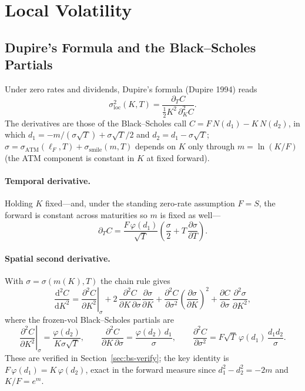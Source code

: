\documentclass[11pt]{book}
\theoremstyle{plain}
\theoremstyle{definition}
\theoremstyle{remark}
\newcommand{\mln}{m}                             %
\newcommand{\lF}{\ell_F}                         %
\newcommand{\ssm}{\sigma_{\mathrm{smile}}}       %
\newcommand{\satm}{\sigma_{\mathrm{ATM}}}        %
\newcommand{\sloc}{\sigma_{\mathrm{loc}}}        %
\newcommand{\npdf}{\varphi}                      %
\newcommand{\ncdf}{N}                            %
\newcommand{\SigmaM}{\Sigma_M}                   %
\newcommand{\dd}{\mathrm{d}}                                  %
\newcommand{\pd}[2]{\frac{\partial #1}{\partial #2}}          %
\newcommand{\pdd}[2]{\frac{\partial^2 #1}{\partial #2^2}}     %
\newcommand{\pdc}[3]{\frac{\partial^2 #1}{\partial #2\,\partial #3}} %
\newcommand{\atfixed}[2]{\left.#1\right|_{#2}}                %
\begin{document}
\section{Local Volatility}
\label{sec:localvol}

\subsection{Dupire's Formula and the Black--Scholes Partials}
\label{sec:dupire}

Under zero rates and dividends, Dupire's formula (Dupire 1994) reads
\begin{equation}\label{eq:dupire}
\sloc^2(K,T) = \frac{\partial_T C}{\tfrac12 K^2\,\partial_K^2 C}.
\end{equation}
The derivatives are those of the Black--Scholes call
$C = F\,\ncdf(d_1) - K\,\ncdf(d_2)$, in which
$d_1 = -\mln/(\sigma\sqrt{T}) + \sigma\sqrt{T}/2$ and $d_2 = d_1 - \sigma\sqrt{T}$;
$\sigma = \satm(\lF,T) + \ssm(\mln,T)$ depends on $K$ only through
$\mln = \ln(K/F)$ (the ATM component is constant in $K$ at fixed forward).

\paragraph{Temporal derivative.} Holding $K$ fixed---and, under the standing
zero-rate assumption $F = S$, the forward is constant across maturities so
$\mln$ is fixed as well---
\begin{equation}\label{eq:dT-C}
\partial_T C = \frac{F\,\npdf(d_1)}{\sqrt{T}}
\left(\frac{\sigma}{2} + T\,\pd{\sigma}{T}\right).
\end{equation}

\paragraph{Spatial second derivative.} With $\sigma = \sigma(\mln(K),T)$ the
chain rule gives
\begin{equation}\label{eq:d2K-C}
\frac{\dd^2 C}{\dd K^2}
= \atfixed{\pdd{C}{K}}{\sigma}
+ 2\,\pdc{C}{K}{\sigma}\pd{\sigma}{K}
+ \pdd{C}{\sigma}\left(\pd{\sigma}{K}\right)^{\!2}
+ \pd{C}{\sigma}\,\pdd{\sigma}{K},
\end{equation}
where the frozen-vol Black--Scholes partials are
\begin{equation}\label{eq:bs-partials}
\atfixed{\pdd{C}{K}}{\sigma} = \frac{\npdf(d_2)}{K\sigma\sqrt{T}},
\qquad
\pdc{C}{K}{\sigma} = \frac{\npdf(d_2)\,d_1}{\sigma},
\qquad
\pdd{C}{\sigma} = F\sqrt{T}\,\npdf(d_1)\,\frac{d_1 d_2}{\sigma}.
\end{equation}
These are verified in Section~\ref{sec:bs-verify}; the key identity is
$F\,\npdf(d_1) = K\,\npdf(d_2)$, exact in the forward measure since
$d_1^2 - d_2^2 = -2\mln$ and $K/F = e^{\mln}$.
\end{document}
